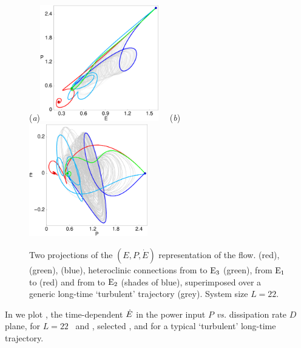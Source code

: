 \begin{figure}[t]
\begin{center}
(\textit{a})\!\!\!\!\includegraphics[width=0.46\textwidth]{figs/connEP.eps}%
~~(\textit{b})\!\!\!\!\includegraphics[width=0.46\textwidth]{figs/connPEdot.eps}
\end{center}
\caption{
Two projections of the $(E,P,\dot{E})$ representation of the flow.
 (red),  (green),  (blue),
heteroclinic connections from  to $\mathrm{E}_{3}$ (green),
from $\mathrm{E}_{1}$ to  (red)
and from  to $\mathrm{E}_{2}$ (shades of blue), superimposed over
a generic long-time `turbulent' trajectory (grey).
System size $L=22$.
        }
\label{f:drivedragConn}
\end{figure}

In  we plot , the time-dependent
$\dot{E}$ in the power input $P$ {\em vs.}
dissipation rate $D$
plane, for $L=22$ \eqva\ and \reqva,
selected \rpo, and for a typical `turbulent' long-time
trajectory.


